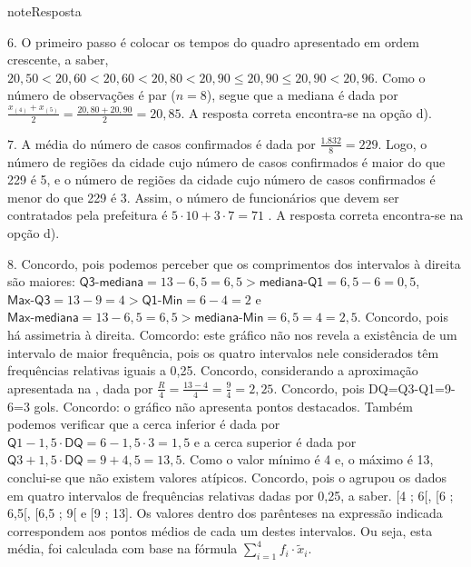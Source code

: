 \begin{sphinxadmonition}{note}{Resposta}
\begin{enumerate}
\end{enumerate}

\(6.\) O primeiro passo é colocar os tempos do quadro apresentado em ordem crescente, a saber, \(20,50< 20,60< 20,60< 20,80< 20,90 \leq  20,90 \leq 20,90 < 20,96\). Como o número de observações é par (\(n=8\)), segue que a mediana é dada por \(\frac{x_{(4)}+x_{(5)}}{2}=\frac{20,80+20,90}{2}=20,85.\) A resposta correta encontra-se na opção d).

\(7.\) A média do número de casos confirmados é dada por \(\frac{1.832}{8}= 229\). Logo, o número de regiões da cidade cujo número de casos confirmados é maior do que 229 é 5, e o número de regiões da cidade cujo número de casos confirmados é menor do que 229 é 3. Assim, o número de funcionários que devem ser contratados pela prefeitura é \(5\cdot 10 + 3\cdot 7= 71\) . A resposta correta encontra-se na opção d).

\(8.\)  Concordo, pois podemos perceber que os comprimentos dos intervalos à direita são maiores: \(\textsf{Q3-mediana}=13-6,5=6,5>\textsf{mediana-Q1}=6,5-6=0,5\), \(\textsf{Max-Q3}=13-9=4>\textsf{Q1-Min}=6-4=2\) e \(\textsf{Max-mediana}=13-6,5=6,5>\textsf{mediana-Min}=6,5=4=2,5\).   Concordo, pois há assimetria à direita.   Comcordo: este gráfico não nos revela a existência de um intervalo de maior frequência, pois os quatro intervalos nele considerados têm frequências relativas iguais a 0,25.  Concordo, considerando a aproximação apresentada na , dada por \(\frac{R}{4}=\frac{13-4}{4}=\frac{9}{4}=2,25.\)  Concordo, pois DQ=Q3-Q1=9-6=3 gols.  Concordo: o gráfico não apresenta pontos destacados. Também podemos verificar que a cerca inferior é dada por \(\textsf{Q}1-1,5\cdot\textsf{DQ}=6-1,5\cdot 3=1,5\) e a cerca superior é dada por \(\textsf{Q}3+1,5\cdot \textsf{DQ}=9+4,5=13,5\). Como o valor mínimo é 4 e, o máximo é 13, conclui-se que não existem valores atípicos.  Concordo, pois o  agrupou os dados em quatro intervalos de frequências relativas dadas por 0,25, a saber. {[}4 ; 6{[}, {[}6 ; 6,5{[}, {[}6,5 ; 9{[} e {[}9 ; 13{]}. Os valores dentro dos parênteses na expressão indicada correspondem aos pontos médios de cada um destes intervalos. Ou seja, esta média, foi calculada com base na fórmula \(\displaystyle{\sum^4_{i=1}}f_i\cdot\tilde{x}_i\).


\end{sphinxadmonition}
